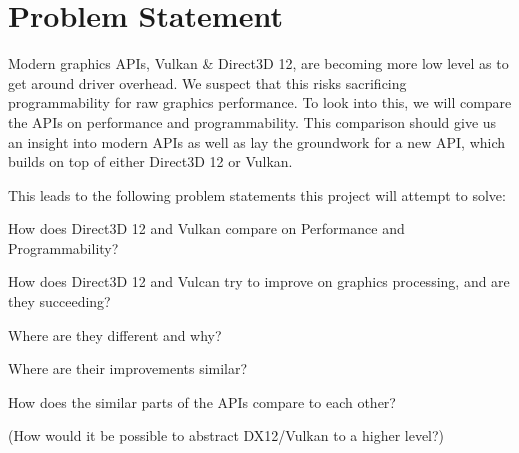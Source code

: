 \section{Problem Statement}\label{sec:problem_statement}
\begin{sectionmeta}

Modern graphics APIs, Vulkan & Direct3D 12, are becoming more low level as to get around driver overhead. 
We suspect that this risks sacrificing programmability for raw graphics performance. 
To look into this, we will compare the APIs on performance and programmability. 
This comparison should give us an insight into modern APIs as well as lay the groundwork for a new API, which builds on top of either Direct3D 12 or Vulkan.

This leads to the following problem statements this project will attempt to solve:

How does Direct3D 12 and Vulkan compare on Performance and Programmability?

How does Direct3D 12 and Vulcan try to improve on graphics processing, and are they succeeding?

Where are they different and why?

Where are their improvements similar? 

How does the similar parts of the APIs compare to each other?

(How would it be possible to abstract DX12/Vulkan to a higher level?)

\end{sectionmeta}